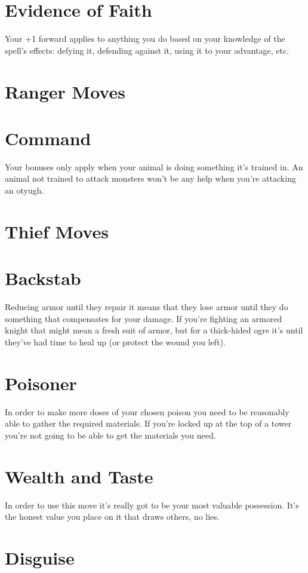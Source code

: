 \section{Evidence of Faith}


 Your +1 forward applies to anything you do based on your knowledge of the spell's effects: defying it, defending against it, using it to your advantage, etc.
\section{Ranger Moves}
\section{Command}


 Your bonuses only apply when your animal is doing something it's trained in. An animal not trained to attack monsters won't be any help when you're attacking an otyugh.
\section{Thief Moves}
\section{Backstab}


 Reducing armor until they repair it means that they lose armor until they do something that compensates for your damage. If you're fighting an armored knight that might mean a fresh suit of armor, but for a thick-hided ogre it's until they've had time to heal up (or protect the wound you left).
\section{Poisoner}


 In order to make more doses of your chosen poison you need to be reasonably able to gather the required materials. If you're locked up at the top of a tower you're not going to be able to get the materials you need.
\section{Wealth and Taste}


 In order to use this move it's really got to be your most valuable possession. It's the honest value you place on it that draws others, no lies.
\section{Disguise}


